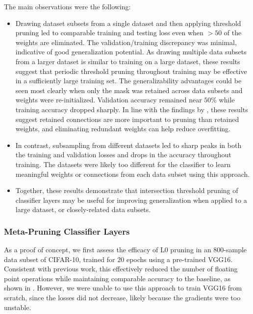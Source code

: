 \documentclass{article}
\begin{document}
The main observations were the following:
\begin{itemize}
	\item Drawing dataset subsets from a single dataset and then applying threshold pruning led to comparable training and testing loss even when $>50$ of the weights are eliminated. The validation/training discrepancy was minimal, indicative of good generalization potential. As drawing multiple data subsets from a larger dataset is similar to training on a large dataset, these results suggest that periodic threshold pruning throughout training may be effective in a sufficiently large training set. The generalizability advantages could be seen most clearly when only the mask was retained across data subsets and weights were re-initialized. Validation accuracy remained near $50$\% while training accuracy dropped sharply. In line with the findings by \citet{prune_for_architecture}, these results suggest retained connections are more important to pruning than retained weights, and eliminating redundant weights can help reduce overfitting.
	\item In contrast, subsampling from different datasets led to sharp peaks in both the training and validation losses and drops in the accuracy throughout training. The datasets were likely too different for the classifier to learn meaningful weights or connections from each data subset using this approach.
	\item Together, these results demonstrate that intersection threshold pruning of classifier layers may be useful for improving generalization when applied to a large dataset, or closely-related data subsets.
\end{itemize}



\subsubsection{Meta-Pruning Classifier Layers}

As a proof of concept, we first assess the efficacy of L0 pruning in an $800$-sample data subset of CIFAR-10, trained for $20$ epochs using a pre-trained VGG16. Consistent with previous work, this effectively reduced the number of floating point operations while maintaining comparable accuracy to the baseline, as shown in . However, we were unable to use this approach to train VGG16 from scratch, since the losses did not decrease, likely because the gradients were too unstable. 
\end{document}
